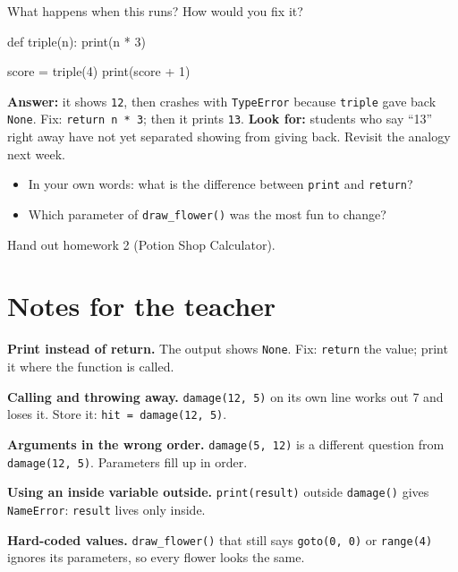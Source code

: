 \begin{formativecheck}
What happens when this runs? How would you fix it?
\begin{pycode}
def triple(n):
    print(n * 3)

score = triple(4)
print(score + 1)
\end{pycode}
\textbf{Answer:} it shows \texttt{12}, then crashes with \texttt{TypeError} because \texttt{triple} gave back \texttt{None}.
Fix: \texttt{return n * 3}; then it prints \texttt{13}.
\textbf{Look for:} students who say \enquote{13} right away have not yet separated showing from giving back. Revisit the analogy next week.
\end{formativecheck}

\begin{reflection}
\begin{itemize}[leftmargin=1.2em]
  \item In your own words: what is the difference between \texttt{print} and \texttt{return}?
  \item Which parameter of \texttt{draw\_flower()} was the most fun to change?
\end{itemize}
\end{reflection}
Hand out homework 2 (Potion Shop Calculator).

\section{Notes for the teacher}
\begin{commonmistakes}
  \item \textbf{Print instead of return.} The output shows \texttt{None}. Fix: \texttt{return} the value; print it where the function is called.
  \item \textbf{Calling and throwing away.} \texttt{damage(12, 5)} on its own line works out 7 and loses it. Store it: \texttt{hit = damage(12, 5)}.
  \item \textbf{Arguments in the wrong order.} \texttt{damage(5, 12)} is a different question from \texttt{damage(12, 5)}. Parameters fill up in order.
  \item \textbf{Using an inside variable outside.} \texttt{print(result)} outside \texttt{damage()} gives \texttt{NameError}: \texttt{result} lives only inside.
  \item \textbf{Hard-coded values.} \texttt{draw\_flower()} that still says \texttt{goto(0, 0)} or \texttt{range(4)} ignores its parameters, so every flower looks the same.
\end{commonmistakes}

